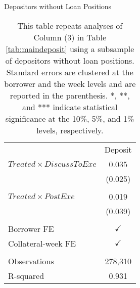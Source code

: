 \clearpage
\newpage



\begin{table}[ht!]
\caption{Depositors without Loan Positions }\label{tab:robust}
\caption*{This table repeats analyses of Column (3) in Table \ref{tab:maindeposit} using a subsample of depositors without loan positions. Standard errors are clustered at the borrower and the week levels and are reported in the parenthesis. *, **, and *** indicate statistical significance at the 10\%, 5\%, and 1\% levels, respectively. }


\centering
\def\sym#1{\ifmmode^{#1}\else\(^{#1}\)\fi}


\begin{tabular*}{0.5\linewidth}{@{\extracolsep{\fill}}lc }
    \toprule

          & Deposit  \\
\cmidrule{2-2}    $Treated \times DiscussToExe$ & 0.035  \\
          & (0.025)  \\
          &         \\
    $Treated \times PostExe $& 0.019 \\
          & (0.039) \\
          &                \\
    Borrower FE &    $\checkmark$       \\
    Collateral-week FE &  $\checkmark$         \\
          &              \\
    Observations & 278,310 \\
    R-squared & 0.931 \\
    \bottomrule
          \end{tabular*} 



\end{table}%

\clearpage
\newpage
%